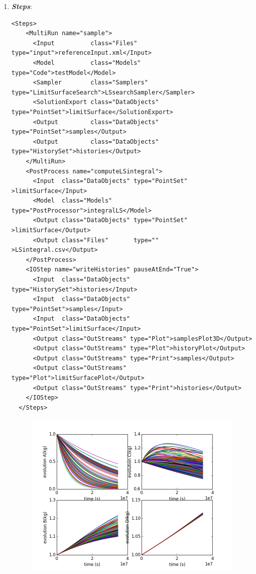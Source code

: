 \begin{enumerate}
\begin{figure}[h!]
 \end{figure}
   \item \textbf{\textit{Steps}}:
\begin{lstlisting}[style=XML,morekeywords={arg,extension,pauseAtEnd,overwrite}]
  <Steps>
    <MultiRun name="sample">
      <Input          class="Files"       type="input">referenceInput.xml</Input>
      <Model          class="Models"      type="Code">testModel</Model>
      <Sampler        class="Samplers"    type="LimitSurfaceSearch">LSsearchSampler</Sampler>
      <SolutionExport class="DataObjects" type="PointSet">limitSurface</SolutionExport>
      <Output         class="DataObjects" type="PointSet">samples</Output>
      <Output         class="DataObjects" type="HistorySet">histories</Output>
    </MultiRun>
    <PostProcess name="computeLSintegral">
      <Input  class="DataObjects" type="PointSet"     >limitSurface</Input>
      <Model  class="Models"      type="PostProcessor">integralLS</Model>
      <Output class="DataObjects" type="PointSet"     >limitSurface</Output>
      <Output class="Files"       type=""             >LSintegral.csv</Output>
    </PostProcess>
    <IOStep name="writeHistories" pauseAtEnd="True">
      <Input  class="DataObjects"      type="HistorySet">histories</Input>
      <Input  class="DataObjects"      type="PointSet">samples</Input>
      <Input  class="DataObjects"      type="PointSet">limitSurface</Input>
      <Output class="OutStreams" type="Plot">samplesPlot3D</Output>
      <Output class="OutStreams" type="Plot">historyPlot</Output>
      <Output class="OutStreams" type="Print">samples</Output>
      <Output class="OutStreams" type="Plot">limitSurfacePlot</Output>
      <Output class="OutStreams" type="Print">histories</Output>
    </IOStep>
  </Steps>
\end{lstlisting}
 \begin{figure}[h!]
  \centering
  \includegraphics[scale=0.7]{pics/LS_histories.png}

\end{figure}
\end{enumerate}
